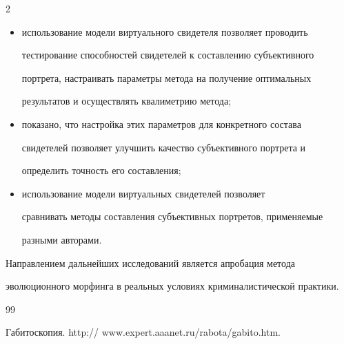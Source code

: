 \begin{multicols}{2}





\noindent


\begin{itemize}


\item использование модели виртуального свидетеля позволяет проводить 


тестирование способностей свидетелей к составлению субъективного 


портрета, настраивать параметры метода на получение оптимальных 


результатов и осуществлять квалиметрию метода;


\item показано, что настройка этих параметров для конкретного состава 


свидетелей позволяет улучшить качество субъективного портрета и 


определить точность его составления;


\item использование модели виртуальных свидетелей позволяет 


сравнивать методы составления субъективных портретов, применяемые 


разными авторами.


\end{itemize}





     Направлением дальнейших исследований является апробация метода 


эволюционного морфинга в реальных условиях криминалистической практики. 


     


{\small\frenchspacing


{%




\begin{thebibliography}{99}









Габитоскопия. {\sf http:// www.expert.aaanet.ru/rabota/gabito.htm}.






\end{thebibliography}}}
\end{multicols}
